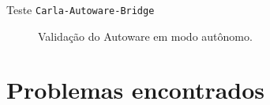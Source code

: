 \documentclass{if-beamer}
\begin{document}
\begin{frame}{Teste \texttt{Carla-Autoware-Bridge}}

\begin{figure}[H]
	\centering
	\caption{Validação do Autoware em modo autônomo.}
	\label{fig:teste0autoware}
\end{figure}


\end{frame}

\section{Problemas encontrados}
\end{document}
